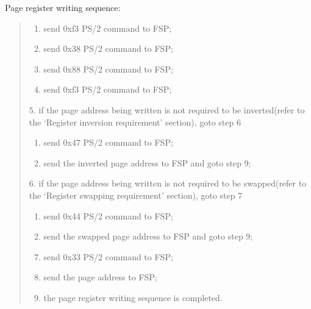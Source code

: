 \documentclass[a4paper,8pt,english]{sphinxmanual}
\begin{document}
Page register writing sequence:
\begin{quote}
\begin{enumerate}
\item {} 
send 0xf3 PS/2 command to FSP;

\item {} 
send 0x38 PS/2 command to FSP;

\item {} 
send 0x88 PS/2 command to FSP;

\item {} 
send 0xf3 PS/2 command to FSP;

\end{enumerate}

5. if the page address being written is not required to be
inverted(refer to the `Register inversion requirement' section),
goto step 6
\begin{enumerate}
\item {} 
send 0x47 PS/2 command to FSP;

\item {} 
send the inverted page address to FSP and goto step 9;

\end{enumerate}

6. if the page address being written is not required to be
swapped(refer to the `Register swapping requirement' section),
goto step 7
\begin{enumerate}
\item {} 
send 0x44 PS/2 command to FSP;

\item {} 
send the swapped page address to FSP and goto step 9;

\end{enumerate}
\begin{enumerate}
\setcounter{enumi}{6}
\item {} 
send 0x33 PS/2 command to FSP;

\item {} 
send the page address to FSP;

\item {} 
the page register writing sequence is completed.

\end{enumerate}
\end{quote}
\end{document}
